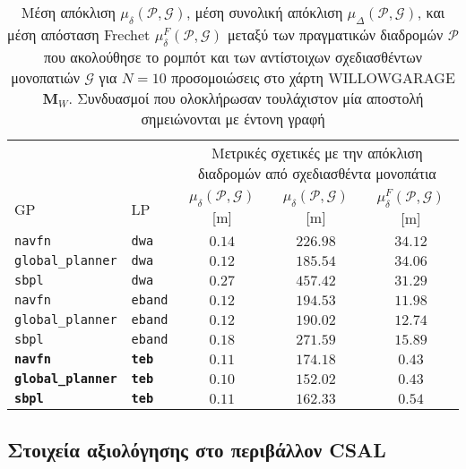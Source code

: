 \begin{table}[h]
\renewcommand{\arraystretch}{1.3}
\begin{tabular}{llccc}
  & & \multicolumn{3}{c}{Μετρικές σχετικές με την απόκλιση διαδρομών από σχεδιασθέντα μονοπάτια} \\
  \cline{3-5}
  GP & LP & $\mu_{\delta}(\bm{\mathcal{P}},\bm{\mathcal{G}})$ [m] & $\mu_{\delta}(\bm{\mathcal{P}},\bm{\mathcal{G}})$ [m] & $\mu_{\delta}^F(\bm{\mathcal{P}},\bm{\mathcal{G}})$ [m] \\ \toprule
  \texttt{navfn} & \texttt{dwa} & $0.14$ & $226.98$ & $34.12$ \\
  \texttt{global\_planner} & \texttt{dwa} & $0.12$ & $185.54$ & $34.06$ \\
  \texttt{sbpl} & \texttt{dwa} & $0.27$ & $457.42$ & $31.29$ \\
  \texttt{navfn} & \texttt{eband} & $0.12$ & $194.53$ & $11.98$ \\
  \texttt{global\_planner} & \texttt{eband} & $0.12$ & $190.02$ & $12.74$ \\
  \texttt{sbpl} & \texttt{eband} & $0.18$ & $271.59$ & $15.89$ \\
  \textbf{\texttt{navfn}} & \textbf{\texttt{teb}} & $\bm{0.11}$ & $\bm{174.18}$ & $\bm{0.43}$ \\
  \textbf{\texttt{global\_planner}} & \textbf{\texttt{teb}} & $\bm{0.10}$ & $\bm{152.02}$ & $\bm{0.43}$ \\
  \textbf{\texttt{sbpl}} & \textbf{\texttt{teb}} & $\bm{0.11}$ & $\bm{162.33}$ & $\bm{0.54}$ \\ \bottomrule
\end{tabular}
\caption{\small Μέση απόκλιση $\mu_{\delta}(\bm{\mathcal{P}},\bm{\mathcal{G}})$,
         μέση συνολική απόκλιση
         $\mu_{\Delta}(\bm{\mathcal{P}},\bm{\mathcal{G}})$, και μέση απόσταση
         Frechet $\mu_{\delta}^F(\bm{\mathcal{P}},\bm{\mathcal{G}})$ μεταξύ των
         πραγματικών διαδρομών $\bm{\mathcal{P}}$ που ακολούθησε το ρομπότ και
         των αντίστοιχων σχεδιασθέντων μονοπατιών $\bm{\mathcal{G}}$ για $N=10$
         προσομοιώσεις στο χάρτη WILLOWGARAGE $\bm{M}_W$. Συνδυασμοί που
         ολοκλήρωσαν τουλάχιστον μία αποστολή σημειώνονται με έντονη γραφή}
\label{tbl:info_deviation_from_global_plan_willowgarage}
\end{table}



\subsection{Στοιχεία αξιολόγησης στο περιβάλλον CSAL}
\label{appendix:evaluation_csal}

